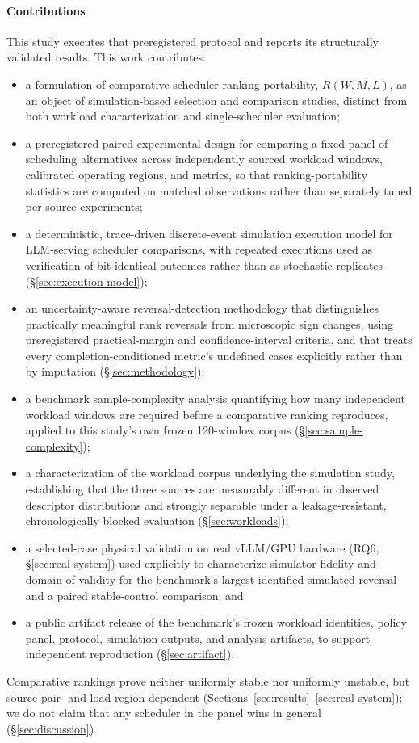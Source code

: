 \paragraph{Contributions} This study executes that preregistered protocol
and reports its structurally validated results. This work contributes:

\begin{itemize}
  \item a formulation of comparative scheduler-ranking portability,
    $R(W, M, L)$, as an object of simulation-based selection and comparison
    studies, distinct from both workload characterization and
    single-scheduler evaluation;
  \item a preregistered paired experimental design for comparing a fixed
    panel of scheduling alternatives across independently sourced workload
    windows, calibrated operating regions, and metrics, so that
    ranking-portability statistics are computed on matched observations
    rather than separately tuned per-source experiments;
  \item a deterministic, trace-driven discrete-event simulation execution
    model for LLM-serving scheduler comparisons, with repeated executions
    used as verification of bit-identical outcomes rather than as
    stochastic replicates (\S\ref{sec:execution-model});
  \item an uncertainty-aware reversal-detection methodology that
    distinguishes practically meaningful rank reversals from microscopic
    sign changes, using preregistered practical-margin and
    confidence-interval criteria, and that treats every
    completion-conditioned metric's undefined cases explicitly rather than
    by imputation (\S\ref{sec:methodology});
  \item a benchmark sample-complexity analysis quantifying how many
    independent workload windows are required before a comparative ranking
    reproduces, applied to this study's own frozen 120-window corpus
    (\S\ref{sec:sample-complexity});
  \item a characterization of the workload corpus underlying the
    simulation study, establishing that the three sources are measurably
    different in observed descriptor distributions and strongly separable
    under a leakage-resistant, chronologically blocked evaluation
    (\S\ref{sec:workloads});
  \item a selected-case physical validation on real vLLM/GPU hardware
    (RQ6, \S\ref{sec:real-system}) used explicitly to characterize
    simulator fidelity and domain of validity for the benchmark's largest
    identified simulated reversal and a paired stable-control comparison;
    and
  \item a public artifact release of the benchmark's frozen workload
    identities, policy panel, protocol, simulation outputs, and analysis
    artifacts, to support independent reproduction (\S\ref{sec:artifact}).
\end{itemize}

Comparative rankings prove neither uniformly stable nor uniformly
unstable, but source-pair- and load-region-dependent
(Sections~\ref{sec:results}--\ref{sec:real-system}); we do not claim that
any scheduler in the panel wins in general (\S\ref{sec:discussion}).

